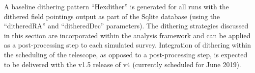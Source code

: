 A baseline dithering pattern ``Hexdither'' is generated for all \OpSim runs with the dithered field pointings output as part of the Sqlite database (using the ``ditheredRA'' and ``ditheredDec'' parameters).  The dithering strategies discussed in this section are incorporated within the \MAF analysis framework and can be applied as a post-processing step to each simulated \OpSim survey. Integration of dithering within the scheduling of the telescope, as opposed to a post-processing step, is expected to be delivered with the v1.5 release of \OpSim v4 (currently scheduled for June 2019).



\navigationbar
